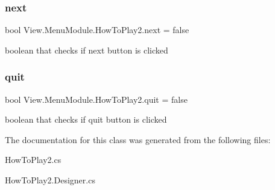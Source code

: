 \subsubsection{\texorpdfstring{next}{next}}
{\footnotesize\ttfamily bool View.\+Menu\+Module.\+How\+To\+Play2.\+next = false}

boolean that checks if next button is clicked \hypertarget{class_view_1_1_menu_module_1_1_how_to_play2_af31369fd9237a7c96ede9eb79d749223}{}\label{class_view_1_1_menu_module_1_1_how_to_play2_af31369fd9237a7c96ede9eb79d749223} 
\subsubsection{\texorpdfstring{quit}{quit}}
{\footnotesize\ttfamily bool View.\+Menu\+Module.\+How\+To\+Play2.\+quit = false}

boolean that checks if quit button is clicked 

The documentation for this class was generated from the following files\+:\begin{DoxyCompactItemize}
\item 
How\+To\+Play2.\+cs\item 
How\+To\+Play2.\+Designer.\+cs\end{DoxyCompactItemize}
